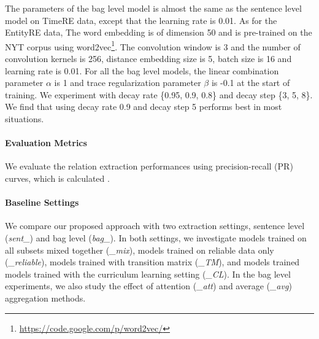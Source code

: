 The parameters of the bag level model is almost the same as the sentence level model on TimeRE data, except that the learning rate is 0.01. As for the EntityRE data, The word embedding is of dimension 50 and is pre-trained on the NYT corpus using word2vec\footnote{\url{ https://code.google.com/p/word2vec/}}. The convolution window is 3 and the number of convolution kernels is 256, distance embedding size is 5, batch size is 16 and learning rate is 0.01. For all the bag level models, the linear combination parameter $\alpha$ is 1 and trace regularization parameter $\beta$ is -0.1 at the start of training. We experiment with decay rate \{0.95, 0.9, 0.8\} and decay step \{3, 5, 8\}. We find that using decay rate 0.9 and decay step 5 performs best in most situations.

\paragraph{Evaluation Metrics} 
We evaluate the relation extraction performances using precision-recall (PR) curves, which is calculated .
 
\paragraph{Baseline Settings} 
We compare our proposed approach with two extraction settings, sentence level (\emph{sent\_}) and bag level (\emph{bag\_}). In both settings, we investigate models trained on all subsets mixed together (\emph{\_mix}), models trained on reliable data only (\emph{\_reliable}), models trained with transition matrix (\emph{\_TM}), and models trained models trained with the curriculum learning setting  (\emph{\_CL}). In the bag level experiments, we also study the effect of attention (\emph{\_att}) and average (\emph{\_avg}) aggregation methods. 


